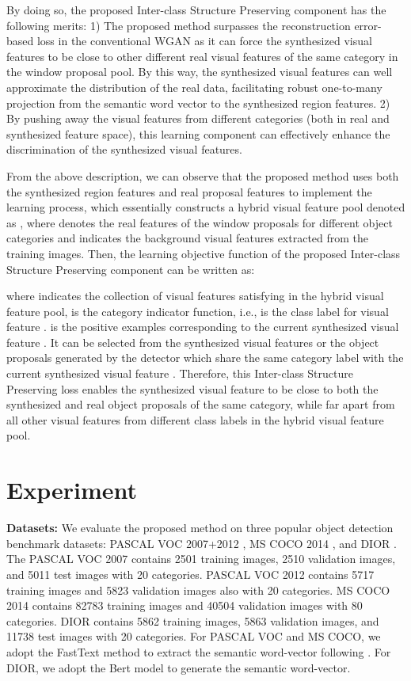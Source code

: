 \documentclass[10pt,twocolumn,letterpaper]{article}
\begin{document}
By doing so, the proposed Inter-class Structure Preserving component has the following merits: 1) The proposed method surpasses the reconstruction error-based loss in the conventional WGAN as it can force the synthesized visual features to be close to other different real visual features of the same category in the window proposal pool. By this way, the synthesized visual features can well approximate the distribution of the real data, facilitating robust one-to-many projection from the semantic word vector to the synthesized region features. 2) By pushing away the visual features from different categories (both in real and synthesized feature space), this learning component can effectively enhance the discrimination of the synthesized visual features.

From the above description, we can observe that the proposed method uses both the synthesized region features and real proposal features to implement the learning process, which essentially constructs a hybrid visual feature pool denoted as , where  denotes the real features of the window proposals for different object categories and  indicates the background visual features extracted from the training images. Then, the learning objective function of the proposed Inter-class Structure Preserving component can be written as:

where  indicates the collection of visual features satisfying  in the hybrid visual feature pool,  is the category indicator function, i.e.,  is the class label for visual feature .  is the positive examples corresponding to the current synthesized visual feature . It can be selected from the synthesized visual features or the object proposals generated by the detector which share the same category label with the current synthesized visual feature . Therefore, this Inter-class Structure Preserving loss enables the synthesized visual feature  to be close to both the synthesized and real object proposals of the same category, while far apart from all other visual features from different class labels in the hybrid visual feature pool.






\section{Experiment}
\textbf{Datasets:} We evaluate the proposed method on three popular object detection benchmark datasets:  PASCAL VOC 2007+2012 \cite{everingham2010pascal}, MS COCO 2014 \cite{lin2014microsoft}, and DIOR \cite{li2020object}.  The  PASCAL VOC 2007 contains 2501 training images, 2510 validation images, and 5011 test images with 20 categories. PASCAL VOC 2012 contains 5717 training images and 5823 validation images also with 20 categories. MS COCO 2014 contains 82783 training images and 40504 validation images with 80 categories. DIOR contains 5862 training images, 5863 validation images, and 11738 test images with 20 categories. For PASCAL VOC and MS COCO,  we adopt the FastText method \cite{mikolov-etal-2018-advances} to extract the semantic word-vector following \cite{hayat2020synthesizing}. For DIOR, we adopt the Bert model \cite{devlin2018bert} to generate the semantic word-vector.
\end{document}
